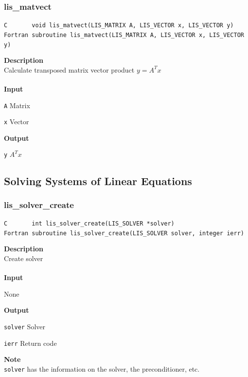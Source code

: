 \documentclass[a4paper]{article}
\newcommand{\namelistlabel}[1]{\mbox{#1}\hfill}
\newenvironment{namelist}[1]{%
 \begin{list}{}
  {\let\makelabel\namelistlabel
  \settowidth{\labelwidth}{#1}
  \setlength{\leftmargin}{1.1\labelwidth}}
}{%
\end{list}}
\begin{document}
  \subsubsection{lis\_matvect}
\begin{screen}
\verb|C       void lis_matvect(LIS_MATRIX A, LIS_VECTOR x, LIS_VECTOR y)|\\
\verb|Fortran subroutine lis_matvect(LIS_MATRIX A, LIS_VECTOR x, LIS_VECTOR y)|
\end{screen}
{\bf Description}\\
\indent
Calculate transposed matrix vector product $y=A^{T}x$
\\ \\
\noindent
{\bf Input}
\begin{namelist}{XXXXXXXXXXXXXXXXXXXX}
\item[\tt A] Matrix
\item[\tt x] Vector
\end{namelist}
{\bf Output}
\begin{namelist}{XXXXXXXXXXXXXXXXXXXX}
\item[\tt y] $A^{T}x$
\end{namelist}
\newpage
\subsection{Solving Systems of Linear Equations}
  \subsubsection{lis\_solver\_create}
\begin{screen}
\verb|C       int lis_solver_create(LIS_SOLVER *solver)|\\
\verb|Fortran subroutine lis_solver_create(LIS_SOLVER solver, integer ierr)|
\end{screen}
{\bf Description}\\
\indent
Create solver
\\ \\
\noindent
{\bf Input}
\begin{namelist}{XXXXXXXXXXXXXXXXXXXX}
\item[None]
\end{namelist}
{\bf Output}
\begin{namelist}{XXXXXXXXXXXXXXXXXXXX}
\item[\tt solver] Solver
\item[\tt ierr] Return code
\end{namelist}
{\bf Note}\\
\indent
\verb|solver| has the information on the solver, the preconditioner, etc.
\end{document}
